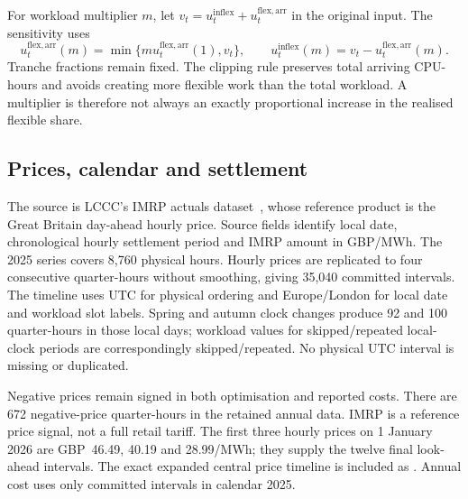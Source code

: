 For workload multiplier $m$, let $v_t=u_t^{\mathrm{inflex}}+u_t^{\mathrm{flex,arr}}$ in the original input. The sensitivity uses
\begin{equation}
u_t^{\mathrm{flex,arr}}(m)=\min\{m u_t^{\mathrm{flex,arr}}(1),v_t\},
\qquad u_t^{\mathrm{inflex}}(m)=v_t-u_t^{\mathrm{flex,arr}}(m).
\end{equation}
Tranche fractions remain fixed. The clipping rule preserves total arriving CPU-hours and avoids creating more flexible work than the total workload. A multiplier is therefore not always an exactly proportional increase in the realised flexible share.



\subsection{Prices, calendar and settlement}
The source is LCCC's IMRP actuals dataset~\cite{lccc_imrp_actuals}, whose reference product is the Great Britain day-ahead hourly price. Source fields identify local date, chronological hourly settlement period and IMRP amount in GBP/MWh. The 2025 series covers 8,760 physical hours. Hourly prices are replicated to four consecutive quarter-hours without smoothing, giving 35,040 committed intervals. The timeline uses UTC for physical ordering and Europe/London for \textcolor{LatestGreen}{local date} and \textcolor{LatestGreen}{workload slot} labels. Spring and autumn clock changes produce 92 and 100 quarter-hours in those local days; workload values for skipped/repeated local-clock periods are correspondingly skipped/repeated. No physical UTC interval is missing or duplicated.

Negative prices remain signed in both optimisation and reported costs. There are 672 negative-price quarter-hours in the retained annual data. IMRP is a \textcolor{LatestGreen}{reference price} signal, not a full retail tariff. The first three hourly prices on 1 January 2026 are GBP~46.49, 40.19 and 28.99/MWh; they supply the twelve final look-ahead intervals. The exact expanded central price timeline is included as . Annual cost uses only committed intervals in calendar 2025.
